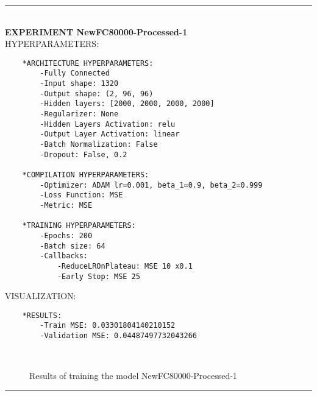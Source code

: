\rule{0.5\textwidth}{0.5pt}\\

	{\large \textbf{EXPERIMENT NewFC80000-Processed-1}}\\
	
	{\normalsize HYPERPARAMETERS:}
	\begin{lstlisting}	
	*ARCHITECTURE HYPERPARAMETERS:
		-Fully Connected
		-Input shape: 1320
		-Output shape: (2, 96, 96)
		-Hidden layers: [2000, 2000, 2000, 2000]
		-Regularizer: None
		-Hidden Layers Activation: relu
		-Output Layer Activation: linear
		-Batch Normalization: False
		-Dropout: False, 0.2
	
	*COMPILATION HYPERPARAMETERS:
		-Optimizer: ADAM lr=0.001, beta_1=0.9, beta_2=0.999
		-Loss Function: MSE
		-Metric: MSE
	
	*TRAINING HYPERPARAMETERS:
		-Epochs: 200
		-Batch size: 64
		-Callbacks: 
			-ReduceLROnPlateau: MSE 10 x0.1
			-Early Stop: MSE 25
	\end{lstlisting}
	
	{\normalsize VISUALIZATION:}
	\begin{lstlisting}
	*RESULTS:
        -Train MSE: 0.03301804140210152
        -Validation MSE: 0.04487497732043266

	\end{lstlisting}
	
	\begin{figure*}[ht!]
		\hspace{\fill}
		\hspace{\fill}
		\\
		\caption{Results of training the model NewFC80000-Processed-1}
	\end{figure*}
	
\FloatBarrier
\rule{0.5\textwidth}{0.5pt}\\